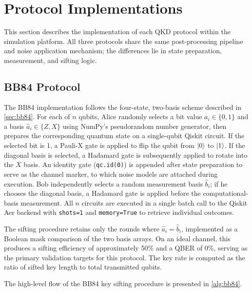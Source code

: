 \documentclass[10pt, a4paper]{report}
\begin{document}
\section{Protocol Implementations}

This section describes the implementation of each QKD protocol within the simulation platform. All three protocols share the same post-processing pipeline and noise application mechanism; the differences lie in state preparation, measurement, and sifting logic.

\subsection{BB84 Protocol}

The BB84 implementation follows the four-state, two-basis scheme described in \cref{sec:bb84}. For each of $n$ qubits, Alice randomly selects a bit value $a_i \in \{0,1\}$ and a basis $\hat{a}_i \in \{Z, X\}$ using NumPy's pseudorandom number generator, then prepares the corresponding quantum state on a single-qubit Qiskit circuit. If the selected bit is 1, a Pauli-X gate is applied to flip the qubit from $\ket{0}$ to $\ket{1}$. If the diagonal basis is selected, a Hadamard gate is subsequently applied to rotate into the $X$ basis. An identity gate (\texttt{qc.id(0)}) is appended after state preparation to serve as the channel marker, to which noise models are attached during execution. Bob independently selects a random measurement basis $\hat{b}_i$; if he chooses the diagonal basis, a Hadamard gate is applied before the computational-basis measurement. All $n$ circuits are executed in a single batch call to the Qiskit Aer backend with \texttt{shots=1} and \texttt{memory=True} to retrieve individual outcomes.

The sifting procedure retains only the rounds where $\hat{a}_i = \hat{b}_i$, implemented as a Boolean mask comparison of the two basis arrays. On an ideal channel, this produces a sifting efficiency of approximately 50\% and a QBER of 0\%, serving as the primary validation targets for this protocol. The key rate is computed as the ratio of sifted key length to total transmitted qubits.

% 

The high-level flow of the BB84 key sifting procedure is presented in \cref{alg:bb84}.
\end{document}
